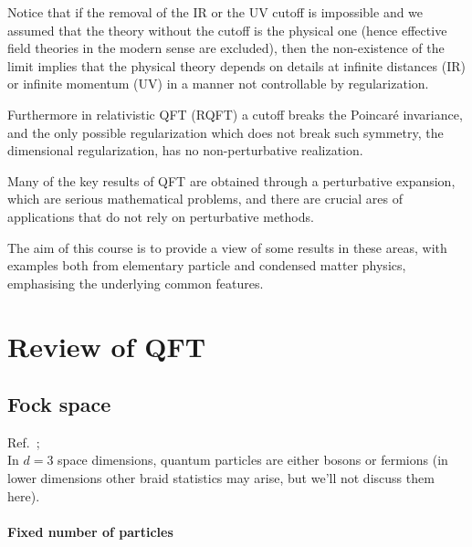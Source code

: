 \documentclass[../main/main.tex]{subfiles}
\begin{document}
Notice that if the removal of the IR or the UV cutoff is impossible and we assumed that the theory without the cutoff is the physical one (hence effective field theories in the modern sense are excluded), then the non-existence of the limit implies that the physical theory depends on details at infinite distances (IR) or infinite momentum (UV) in a manner not controllable by regularization. 

Furthermore in relativistic QFT (RQFT) a cutoff breaks the Poincaré invariance, and the only possible regularization which does not break such symmetry, the dimensional regularization, has no non-perturbative realization. 

Many of the key results of QFT are obtained through a perturbative expansion, which are serious mathematical problems, and there are crucial ares of applications that do not rely on perturbative methods. 

The aim of this course is to provide a view of some results in these areas, with examples both from elementary particle and condensed matter physics, emphasising the underlying common features. 

\chapter{Review of QFT}
\section{Fock space}

\textsf{Ref.~\cite[Chapters 3,4]{Greiner_1996}; \cite[Chapters 1,2]{Bogoliubov:1980}}\\

In $d=3$ space dimensions, quantum particles are either bosons or fermions (in lower dimensions other braid statistics may arise, but we'll not discuss them here). 

\subsubsection{Fixed number of particles}
\end{document}
